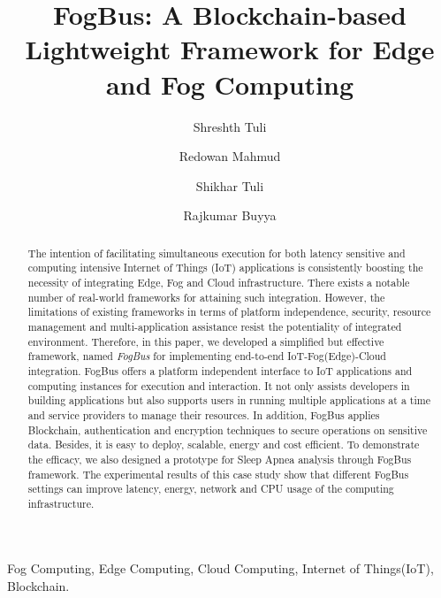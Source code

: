 \documentclass[final,5p,times,twocolumn]{elsarticle}
\begin{document}
\begin{frontmatter}

\title{FogBus: A Blockchain-based Lightweight Framework for Edge and Fog Computing}

\author{Shreshth Tuli}
\author{Redowan Mahmud }
\author{Shikhar Tuli}
\author{Rajkumar Buyya}

\begin{abstract}
The intention of facilitating simultaneous execution for both latency sensitive and computing intensive Internet of Things (IoT) applications is consistently boosting the necessity of integrating Edge, Fog and Cloud infrastructure. There exists a notable number of real-world frameworks for attaining such integration. However, the limitations of existing frameworks in terms of platform independence, security, resource management and multi-application assistance resist the potentiality of integrated environment. Therefore, in this paper, we developed a simplified but effective framework, named \textit{FogBus} for implementing end-to-end IoT-Fog(Edge)-Cloud integration. FogBus offers a platform independent interface to IoT applications and computing instances for execution and interaction. It not only assists developers in building applications but also supports users in running multiple applications at a time and service providers to manage their resources. In addition, FogBus applies Blockchain, authentication and encryption techniques to secure operations on sensitive data. Besides, it is easy to deploy, scalable, energy and cost efficient. To demonstrate the efficacy, we also designed a prototype for Sleep Apnea analysis through FogBus framework. The experimental results of this case study show that different FogBus settings can improve latency, energy, network and CPU usage of the computing infrastructure.  
\end{abstract}

\begin{keyword}
Fog Computing, Edge Computing, Cloud Computing, Internet of Things(IoT), Blockchain.
\end{keyword}

\end{frontmatter}
\end{document}
